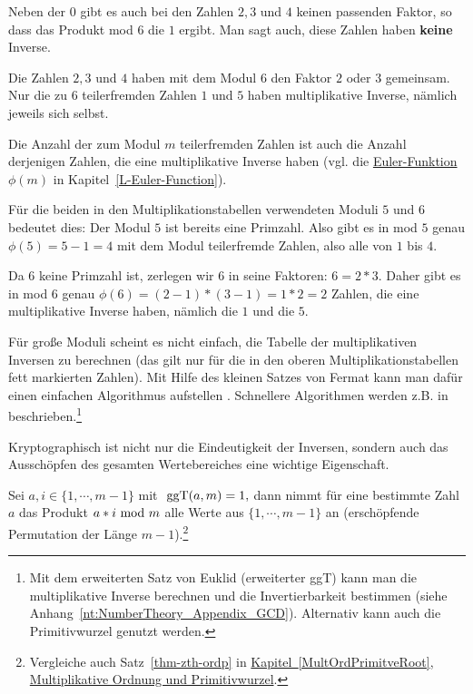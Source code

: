 \begin{refsegment}
Neben der $0$ gibt es auch bei den Zahlen $2, 3$ und $4$ keinen passenden Faktor,
so dass das Produkt mod $6$ die $1$ ergibt. Man sagt auch, diese Zahlen haben
\textbf{keine} Inverse.%

Die Zahlen $2, 3$ und $4$ haben mit dem Modul $6$ den Faktor $2$ oder $3$
gemeinsam.
Nur die zu $6$ teilerfremden Zahlen
$1$ und $5$ haben multiplikative Inverse, nämlich jeweils sich selbst.

Die Anzahl der zum Modul $m$ teilerfremden Zahlen ist auch die Anzahl
derjenigen Zahlen, die eine multiplikative Inverse haben (vgl. die
\hyperlink{EulerFunction}{Euler-Funktion} 
$\phi(m)$ in Kapitel~\ref{L-Euler-Function}).

Für die beiden in den Multiplikationstabellen verwendeten Moduli $5$ und $6$
bedeutet dies:
Der Modul $5$ ist bereits eine Primzahl. Also gibt es in mod $5$ genau $\phi(5) = 5 - 1 = 4$
mit dem Modul teilerfremde Zahlen, also alle von $1$ bis $4$.

Da $6$ keine Primzahl ist, zerlegen wir $6$ in seine Faktoren: $6 = 2 * 3$.
Daher gibt es in mod $6$ genau $\phi(6) = (2-1)*(3-1) = 1 * 2 = 2$ Zahlen, die eine
multiplikative Inverse haben, nämlich die $1$ und die $5$.

Für große Moduli scheint es nicht einfach, die Tabelle der multiplikativen
Inversen zu berechnen (das gilt nur für die in den oberen
Multiplikationstabellen fett markierten Zahlen). Mit Hilfe des kleinen Satzes
von Fermat kann man dafür einen einfachen
Algorithmus aufstellen \cite[S. 80]{Pfleeger1997}. Schnellere Algorithmen
werden z.B. in \cite{Knuth1998} 
beschrieben.\footnote{%
Mit dem erweiterten Satz von Euklid (erweiterter ggT) kann man die
multiplikative Inverse berechnen und die Invertierbarkeit bestimmen
(siehe Anhang~\ref{nt:NumberTheory_Appendix_GCD}).
Alternativ kann auch die Primitivwurzel genutzt werden.
}

Kryptographisch ist nicht nur die Eindeutigkeit der Inversen, sondern auch das
Ausschöpfen des gesamten Wertebereiches eine wichtige
Eigenschaft.

\begin{satz} \label{thm-zth-exhperm}
Sei $a,i\in \{1, \cdots , m-1\}$ mit ${\rm~ggT} (a,m)=1, $ dann nimmt für
eine bestimmte Zahl $a$ das Produkt $a*i {\rm ~mod~} m$  alle Werte aus
$ \{1, \cdots ,m-1\}$ an (erschöpfende Permutation der
Länge $m-1$).\footnote{%
Vergleiche auch Satz~\ref{thm-zth-ordp} in \hyperlink{Chapter_ElementaryNT_9}
{Kapitel~\ref{MultOrdPrimitveRoot}, Multiplikative Ordnung und
Primitivwurzel}.
}
\end{satz}



\end{refsegment}
